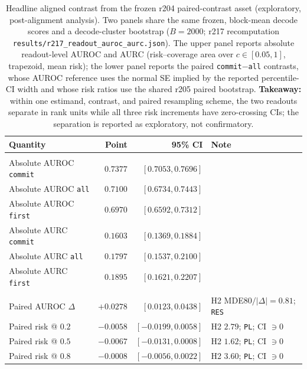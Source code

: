 \documentclass{article}
\begin{document}
\begin{table}[t]
\caption{Headline aligned contrast from the frozen r204 paired-contrast asset (exploratory,
post-alignment analysis).  Two panels share the same frozen, block-mean decode scores and a
decode-cluster bootstrap ($B=2000$; r217 recomputation
\texttt{results/r217\_readout\_auroc\_aurc.json}).  The upper panel reports absolute
readout-level AUROC and AURC (risk--coverage area over $c\in[0.05,1]$, trapezoid, mean risk);
the lower panel reports the paired \texttt{commit}$-$\texttt{all} contrasts, whose AUROC
reference uses the normal SE implied by the reported percentile-CI width and whose risk ratios
use the shared r205 paired bootstrap.  \textbf{Takeaway:} within one estimand, contrast, and
paired resampling scheme, the two readouts separate in rank units while all three risk
increments have zero-crossing CIs; the separation is reported as exploratory, not
confirmatory.}
\label{tab:pairedcontrast}
\centering\footnotesize
\setlength{\tabcolsep}{3pt}
\begin{tabularx}{\linewidth}{@{}>{\raggedright\arraybackslash}Xrr l@{}}
\toprule
Quantity & Point & 95\% CI & Note \\
\midrule
\multicolumn{4}{@{}l}{\emph{Absolute readout level (same frozen scores)}}\\
Absolute AUROC \texttt{commit} & $0.7377$ & $[0.7053,0.7696]$ & \\
Absolute AUROC \texttt{all} & $0.7100$ & $[0.6734,0.7443]$ & \\
Absolute AUROC \texttt{first} & $0.6970$ & $[0.6592,0.7312]$ & \\
Absolute AURC \texttt{commit} & $0.1603$ & $[0.1369,0.1884]$ & \\
Absolute AURC \texttt{all} & $0.1797$ & $[0.1537,0.2100]$ & \\
Absolute AURC \texttt{first} & $0.1895$ & $[0.1621,0.2207]$ & \\
\midrule
\multicolumn{4}{@{}l}{\emph{Paired \texttt{commit}$-$\texttt{all} contrast}}\\
Paired AUROC $\Delta$ & $+0.0278$ & $[0.0123,0.0438]$ & H2 MDE80$/|\Delta|=0.81$; \texttt{RES} \\
Paired risk @ $0.2$ & $-0.0058$ & $[-0.0199,0.0058]$ & H2 $2.79$; \texttt{PL}; CI $\ni0$ \\
Paired risk @ $0.5$ & $-0.0067$ & $[-0.0131,0.0008]$ & H2 $1.62$; \texttt{PL}; CI $\ni0$ \\
Paired risk @ $0.8$ & $-0.0008$ & $[-0.0056,0.0022]$ & H2 $3.60$; \texttt{PL}; CI $\ni0$ \\
\bottomrule
\end{tabularx}
\end{table}
\end{document}
